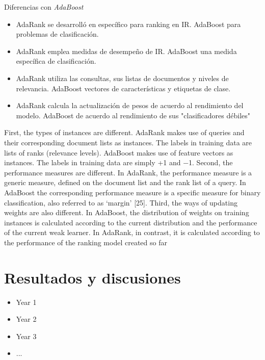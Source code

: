 \documentclass{beamer}
\begin{document}
\begin{frame}{Diferencias con \textit{AdaBoost}}
    \begin{itemize}
        \item AdaRank se desarrolló en específico para ranking en IR. AdaBoost para problemas de clasificación.
        \item AdaRank emplea medidas de desempeño de IR. AdaBoost una medida específica de clasificación.
        \item AdaRank utiliza las consultas, sus listas de documentos y niveles de relevancia. AdaBoost vectores de características y etiquetas de clase.
        \item AdaRank calcula la actualización de pesos de acuerdo al rendimiento del modelo. AdaBoost de acuerdo al rendimiento de sus "clasificadores débiles"
    \end{itemize}

    \begin{note}
        {First, the types of instances are different. AdaRank makes use of queries and their corresponding document lists as instances. The labels in training data are lists of ranks (relevance levels). AdaBoost makes use of feature vectors as instances. The labels in training data are simply +1 and −1. Second, the performance measures are different. In AdaRank, the performance measure is a generic measure, defined on the document list and the rank list of a query. In AdaBoost the corresponding performance measure is a specific measure for binary classification, also referred to as ‘margin’ [25]. Third, the ways of updating weights are also different. In AdaBoost, the distribution of weights on training instances is calculated according to the current distribution and the performance of the current weak learner. In AdaRank, in contrast, it is calculated according to the performance of the ranking model created so far}
    \end{note}
\end{frame}

\section{Resultados y discusiones}
\begin{frame}
    \begin{itemize}
        \item Year 1
        \item Year 2
        \item Year 3
        \item ...
    \end{itemize}

    \begin{note}
        {}
    \end{note}
\end{frame}
\end{document}
